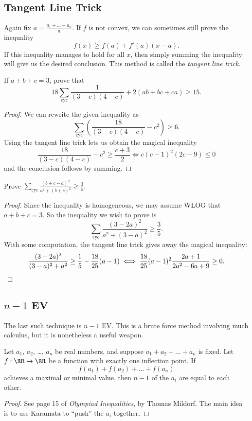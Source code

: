 \documentclass[11pt]{scrartcl}
\begin{document}
\subsection{Tangent Line Trick}
Again fix $a = \frac{a_1 + \dots + a_n}{n}$.
If $f$ is not convex, we can sometimes still prove the inequality
\[ f(x) \ge f(a) + f'(a) \left( x-a \right). \]
If this inequality manages to hold for all $x$,
then simply summing the inequality will give us the desired conclusion.
This method is called the \emph{tangent line trick}.

\begin{example}
   If $a+b+c=3$, prove that \[ 18\sum_{\text{cyc}}\frac{1}{(3-c)(4-c)}+2(ab+bc+ca)\ge 15. \]
\end{example}
\begin{proof}
  We can rewrite the given inequality as
  \[ \sum_{\text{cyc}} \left( \frac{18}{(3-c)(4-c)} - c^2 \right) \ge 6. \]
  Using the tangent line trick lets us obtain the magical inequality
  \[ \frac{18}{(3-c)(4-c)} -c^2 \ge \frac{c+3}{2}\iff c(c-1)^2(2c-9)\le 0 \]
  and the conclusion follows by summing.
\end{proof}
\begin{example}
  [Japan] Prove $\sum_{\text{cyc}} \frac{(b+c-a)^2}{a^2+(b+c)^2} \ge \frac 35$.
\end{example}
\begin{proof}
  Since the inequality is homogeneous, we may assume WLOG that $a+b+c=3$.
  So the inequality we wish to prove is
  \[ \sum_{\text{cyc}} \frac{(3-2a)^2}{a^2+(3-a)^2} \ge \frac 35. \]
  With some computation, the tangent line trick gives away the magical inequality:
  \[
    \frac{(3-2a)^{2}}{(3-a)^{2}+a^{2}}\ge\frac{1}{5} - \frac{18}{25}(a-1)
    \iff
    \frac{18}{25}(a-1)^{2}\frac{2a+1}{2a^{2}-6a+9}
    \ge 0. \qedhere \]
\end{proof}

\subsection{$n-1$ EV}
The last such technique is $n-1$ EV.
This is a brute force method involving much calculus, but it is nonetheless a useful weapon.
\begin{theorem}
  [$n-1$ EV] Let $a_1$, $a_2$, \dots, $a_n$ be real numbers, and suppose $a_1 + a_2 + \dots + a_n$ is fixed.
  Let $f : \RR \to \RR$ be a function with exactly one inflection point.
  If
  \[ f(a_1) + f(a_2) + \dots + f(a_n) \]
  achieves a maximal or minimal value, then $n-1$ of the $a_i$ are equal to each other.
\end{theorem}
\begin{proof}
  See page 15 of \emph{Olympiad Inequalities}, by Thomas Mildorf.
  The main idea is to use Karamata to ``push'' the $a_i$ together.
\end{proof}
\end{document}
